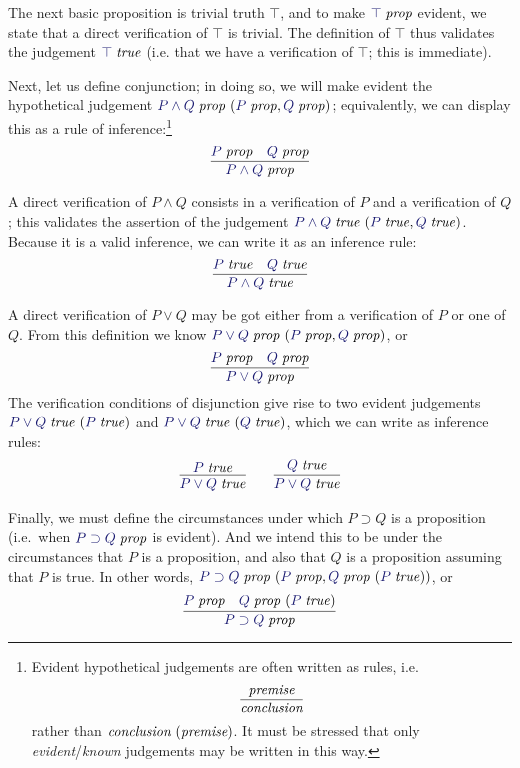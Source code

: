 \documentclass[main.tex]{subfiles}
\begin{document}
The next basic proposition is trivial truth $\top$, and to make
$\isprop{\top}$ evident, we state that a direct verification of $\top$
is trivial. The definition of $\top$ thus validates the judgement
$\istrue{\top}$ (i.e. that we have a verification of $\top$; this
is immediate).

Next, let us define conjunction; in doing so, we will make evident the
hypothetical judgement $\hyp{\isprop{P\land Q}}{\isprop{P},\isprop{Q}}$;
equivalently, we can display this as a rule of inference:\footnote{
Evident hypothetical judgements are often written as rules, i.e.
\[
  \infer{\textit{conclusion}}{\textit{premise}}
\]
rather than $\textit{conclusion}\ (\textit{premise})$. It must be
stressed that only \emph{evident}/\emph{known} judgements may be
written in this way.
}
\[
  \infer{
    \isprop{P\land Q}
  }{
    \isprop{P} &
    \isprop{Q}
  }
\]

A direct verification of $P\land Q$ consists in a verification of $P$
and a verification of $Q$; this validates the assertion of the judgement
$\hyp{\istrue{P\land Q}}{\istrue{P},\istrue{Q}}$. Because it is a valid
inference, we can write it as an inference rule:
\[
  \infer{
    \istrue{P\land Q}
  }{
    \istrue{P} &
    \istrue{Q}
  }
\]

A direct verification of $P\lor Q$ may be got either from a verification
of $P$ or one of $Q$. From this definition we know $\hyp{\isprop{P\lor
Q}}{\isprop{P},\isprop{Q}}$, or
\[
  \infer{
    \isprop{P\lor Q}
  }{
    \isprop{P} &
    \isprop{Q}
  }
\]
The verification conditions of disjunction give
rise to two evident judgements $\hyp{\istrue{P\lor Q}}{\istrue{P}}$ and
$\hyp{\istrue{P\lor Q}}{\istrue{Q}}$, which we can write as inference rules:
\begin{gather*}
  \infer{
    \istrue{P\lor Q}
  }{
    \istrue{P}
  }
  \qquad
  \infer{
    \istrue{P\lor Q}
  }{
    \istrue{Q}
  }
\end{gather*}

Finally, we must define the circumstances under which $P\supset Q$ is
a proposition (i.e.\ when $\isprop{P\supset Q}$ is evident). And we
intend this to be under the circumstances that $P$ is a proposition,
and also that $Q$ is a proposition assuming that $P$ is true. In other
words, $\hyp{\isprop{P\supset Q}}{\isprop{P},
\hyp{\isprop{Q}}{\istrue{P}}}$, or
\[
  \infer{
    \isprop{P\supset Q}
  }{
    \isprop{P} &
    \hyp{\isprop{Q}}{\istrue{P}}
  }
\]
\end{document}

